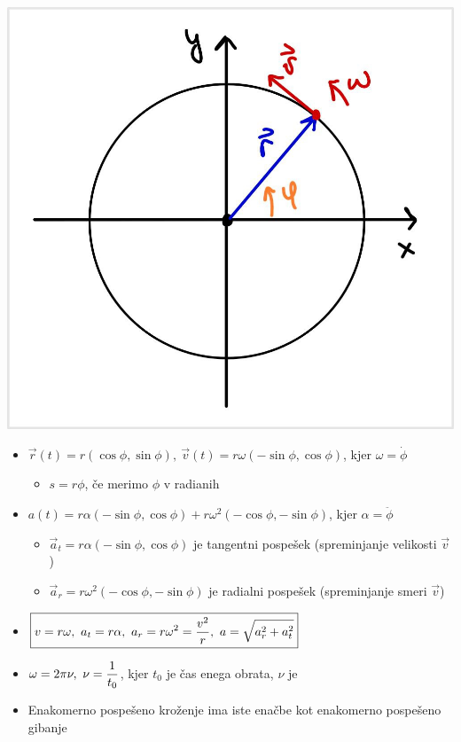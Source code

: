 \begin{minipage}[t]{0.25\textwidth}
    \vspace{0pt}
  \includegraphics[width=\linewidth]{img/01_003.jpg} 
\end{minipage}
\hfill
\begin{minipage}[t]{0.70\textwidth}
    \vspace{0pt}
    \begin{itemize}
        \item \(\vec{r}(t) = r (\cos \phi, \sin \phi), \ \vec{v}(t) = r \omega (-\sin \phi, \cos \phi)\), kjer \(\omega = \dot{\phi}\) 
        \begin{itemize}
            \item \(s = r \phi\), če merimo \(\phi\) v radianih
        \end{itemize}
        \item \(a(t) = r \alpha (-\sin \phi, \cos \phi) + r \omega^2 (-\cos \phi, -\sin \phi)\), kjer \(\alpha = \ddot{\phi}\) 
        \begin{itemize}
            \item \(\vec{a}_t = r \alpha (-\sin \phi, \cos \phi)\) je tangentni pospešek (spreminjanje velikosti \(\vec{v}\))    
            \item \(\vec{a}_r = r \omega^2 (-\cos \phi, -\sin \phi)\) je radialni pospešek (spreminjanje smeri \(\vec{v}\))        
        \end{itemize}
        \item \(\displaystyle \boxed{v = r \omega,\ a_t = r \alpha, \ a_r = r \omega^2 = \frac{v^2}{r}, \ a = \sqrt{a_r^2 + a_t^2}}\)
        \item \(\displaystyle \omega = 2 \pi \nu, \ \nu = \frac{1}{t_0}\), kjer \(t_0\) je čas enega obrata, \(\nu\) je 
        \item Enakomerno pospešeno kroženje ima iste enačbe kot enakomerno pospešeno gibanje
    \end{itemize}
\end{minipage}

